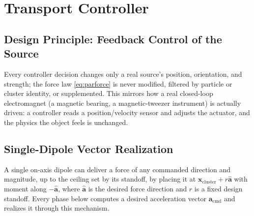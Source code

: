 \documentclass[journal]{IEEEtran}
\begin{document}
\section{Transport Controller}

\subsection{Design Principle: Feedback Control of the Source}
Every controller decision changes only a real source's position,
orientation, and strength; the force law \eqref{eq:parforce} is never
modified, filtered by particle or cluster identity, or supplemented. This
mirrors how a real closed-loop electromagnet (a magnetic bearing, a
magnetic-tweezer instrument) is actually driven: a controller reads a
position/velocity sensor and adjusts the actuator, and the physics the
object feels is unchanged.

\subsection{Single-Dipole Vector Realization}
A single on-axis dipole can deliver a force of any commanded direction and
magnitude, up to the ceiling set by its standoff, by placing it at
$\mathbf{x}_{\mathrm{cluster}} + r\hat{\mathbf{a}}$ with moment along
$-\hat{\mathbf{a}}$, where $\hat{\mathbf{a}}$ is the desired force
direction and $r$ is a fixed design standoff. Every phase below computes a
desired acceleration vector $\mathbf{a}_{\mathrm{cmd}}$ and realizes it
through this mechanism.
\end{document}

